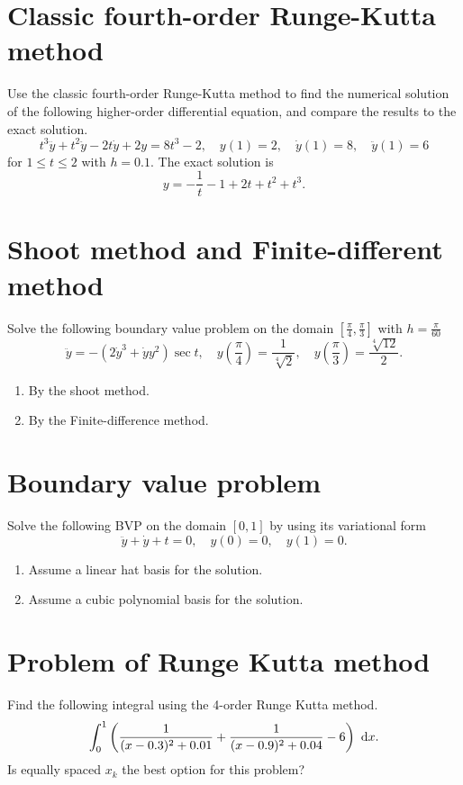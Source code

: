 \section{Classic fourth-order Runge-Kutta method}
Use the classic fourth-order Runge-Kutta method to find the numerical solution of the following higher-order differential equation, and compare the results to the exact solution.
\[ t^3\dddot{y}+t^2\ddot{y}-2t\dot{y}+2y=8t^3-2,\quad y(1)=2, \quad \dot{y}(1)=8, \quad \ddot{y}(1)=6 \]
for \(1\leq t\leq2\) with \(h=0.1\).
The exact solution is
\[ y=-\frac{1}{t}-1+2t+t^2+t^3. \]


\section{Shoot method and Finite-different method}
Solve the following boundary value problem on the domain \(\left[\frac{\pi}{4},\frac{\pi}{3}\right]\) with \(h=\frac{\pi}{60}\)
\[ \ddot{y}=-\left(2\dot{y}^3+\dot{y}y^2\right)\sec t, \quad y\left(\frac{\pi}{4}\right)=\frac{1}{\sqrt[4]{2}}, \quad y\left(\frac{\pi}{3}\right)=\frac{\sqrt[4]{12}}{2}. \]
\begin{enumerate}
	\item By the shoot method.
	\item By the Finite-difference method.
\end{enumerate}


\section{Boundary value problem}
Solve the following BVP on the domain \([0,1]\) by using its variational form
\[ \ddot{y}+\dot{y}+t=0, \quad y(0)=0, \quad y(1)=0. \]
\begin{enumerate}
	\item Assume a linear hat basis for the solution.
	\item Assume a cubic polynomial basis for the solution.
\end{enumerate}


\section{Problem of Runge Kutta method}
Find the following integral using the 4-order Runge Kutta method.
\[ \int_{0}^{1}\left(\frac{1}{(x-0.3)^2+0.01}+\frac{1}{(x-0.9)^2+0.04}-6\right)~\mathrm{d} x. \]
Is equally spaced \(x_k\) the best option for this problem?


